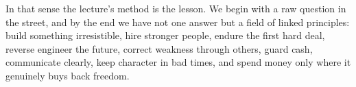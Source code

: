 In that sense the lecture's method is the lesson. We begin with a raw question in the street, and by the end we have not one answer but a field of linked principles: build something irresistible, hire stronger people, endure the first hard deal, reverse engineer the future, correct weakness through others, guard cash, communicate clearly, keep character in bad times, and spend money only where it genuinely buys back freedom.